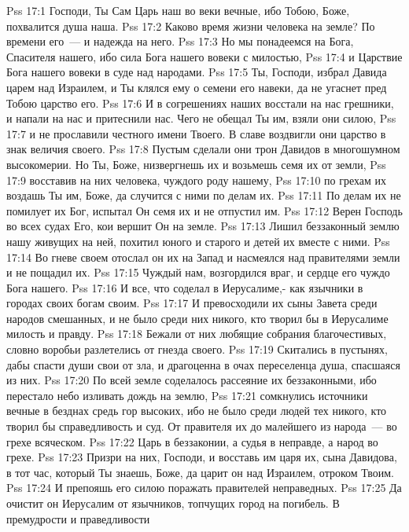 \vs Pss 17:1
Господи, Ты Сам Царь наш во веки вечные, ибо Тобою, Боже,
похвалится душа наша.
\vs Pss 17:2
Каково время жизни человека на земле? По времени его~--- и
надежда на него.
\vs Pss 17:3
Но мы понадеемся на Бога, Спасителя нашего, ибо сила Бога
нашего вовеки с милостью,
\vs Pss 17:4
и Царствие Бога нашего вовеки в суде над народами.
\vs Pss 17:5
Ты, Господи, избрал Давида царем над Израилем, и Ты клялся ему
о семени его навеки, да не угаснет пред Тобою царство его.
\vs Pss 17:6
И в согрешениях наших восстали на нас грешники, и напали на нас
и притеснили нас.
Чего не обещал Ты им, взяли они силою,
\vs Pss 17:7
и не прославили честного имени Твоего. В славе воздвигли они
царство в знак величия своего.
\vs Pss 17:8
Пустым сделали они трон Давидов в многошумном высокомерии.
Но Ты, Боже, низвергнешь их и возьмешь семя их от земли,
\vs Pss 17:9
восставив на них человека, чуждого роду нашему,
\vs Pss 17:10
по грехам их воздашь Ты им, Боже, да случится с ними по делам
их.
\vs Pss 17:11
По делам их не помилует их Бог, испытал Он семя их и не отпустил
им.
\vs Pss 17:12
Верен Господь во всех судах Его, кои вершит Он на земле.
\vs Pss 17:13
Лишил беззаконный землю нашу живущих на ней, похитил юного и старого
и детей их вместе с ними.
\vs Pss 17:14
Во гневе своем отослал он их на Запад и насмеялся над правителями
земли и не пощадил их.
\vs Pss 17:15
Чуждый нам, возгордился враг, и сердце его чуждо Бога нашего.
\vs Pss 17:16
И все, что соделал в Иерусалиме,- как язычники в городах своих богам
своим.
\vs Pss 17:17
И превосходили их сыны Завета среди народов смешанных, и не было
среди них никого, кто творил бы в Иерусалиме милость и правду.
\vs Pss 17:18
Бежали от них любящие собрания благочестивых, словно воробьи
разлетелись от гнезда своего.
\vs Pss 17:19
Скитались в пустынях, дабы спасти души свои от зла, и драгоценна в
очах переселенца душа, спасшаяся из них.
\vs Pss 17:20
По всей земле соделалось рассеяние их беззаконными, ибо перестало
небо изливать дождь на землю,
\vs Pss 17:21
сомкнулись источники вечные в безднах средь гор высоких, ибо не было
среди людей тех никого, кто творил бы справедливость и суд. От правителя их до
малейшего из народа~--- во грехе всяческом.
\vs Pss 17:22
Царь в беззаконии, а судья в неправде, а народ во грехе.
\vs Pss 17:23
Призри на них, Господи, и восставь им царя их, сына Давидова, в тот
час, который Ты знаешь, Боже, да царит он над Израилем, отроком Твоим.
\vs Pss 17:24
И препояшь его силою поражать правителей неправедных.
\vs Pss 17:25
Да очистит он Иерусалим от язычников, топчущих город на погибель. В
премудрости и праведливости
